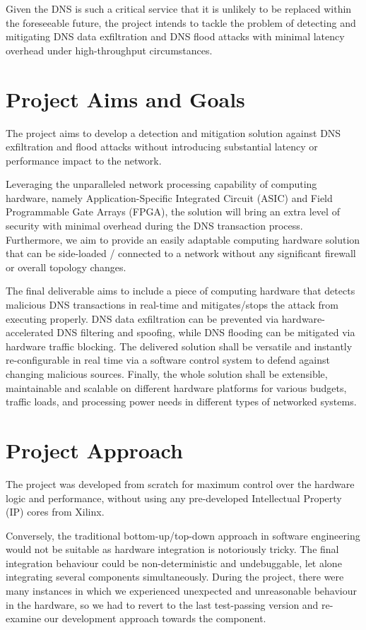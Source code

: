 \documentclass[a4paper]{report}
\begin{document}
Given the DNS is such a critical service that it is unlikely to be replaced within the foreseeable future, the project intends to tackle the problem of detecting and mitigating DNS data exfiltration and DNS flood attacks with minimal latency overhead under high-throughput circumstances.

\section{Project Aims and Goals}

The project aims to develop a detection and mitigation solution against DNS exfiltration and flood attacks without introducing substantial latency or performance impact to the network.

Leveraging the unparalleled network processing capability of computing hardware, namely Application-Specific Integrated Circuit (ASIC) and Field Programmable Gate Arrays (FPGA), the solution will bring an extra level of security with minimal overhead during the DNS transaction process. Furthermore, we aim to provide an easily adaptable computing hardware solution that can be side-loaded / connected to a network without any significant firewall or overall topology changes.

The final deliverable aims to include a piece of computing hardware that detects malicious DNS transactions in real-time and mitigates/stops the attack from executing properly. DNS data exfiltration can be prevented via hardware-accelerated DNS filtering and spoofing, while DNS flooding can be mitigated via hardware traffic blocking. The delivered solution shall be versatile and instantly re-configurable in real time via a software control system to defend against changing malicious sources. Finally, the whole solution shall be extensible, maintainable and scalable on different hardware platforms for various budgets, traffic loads, and processing power needs in different types of networked systems.

\section{Project Approach}

The project was developed from scratch for maximum control over the hardware logic and performance, without using any pre-developed Intellectual Property (IP) cores from Xilinx.

Conversely, the traditional bottom-up/top-down approach in software engineering would not be suitable as hardware integration is notoriously tricky. The final integration behaviour could be non-deterministic and undebuggable, let alone integrating several components simultaneously. During the project, there were many instances in which we experienced unexpected and unreasonable behaviour in the hardware, so we had to revert to the last test-passing version and re-examine our development approach towards the component.
\end{document}
